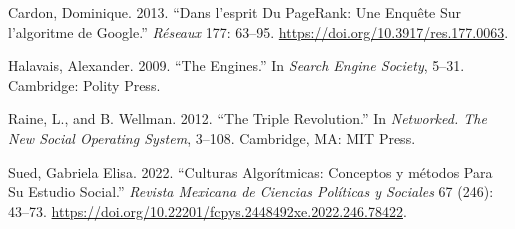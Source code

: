 \documentclass[
]{interact}
\newlength{\cslhangindent}
\newenvironment{CSLReferences}[2] %
 {\begin{list}{}{%
  \setlength{\itemindent}{0pt}
  \setlength{\leftmargin}{0pt}
  \setlength{\parsep}{0pt}
  \ifodd #1
   \setlength{\leftmargin}{\cslhangindent}
   \setlength{\itemindent}{-1\cslhangindent}
  \fi
  \setlength{\itemsep}{#2\baselineskip}}}
 {\end{list}}
\begin{document}
\label{refs}
\begin{CSLReferences}{1}{0}
Cardon, Dominique. 2013. {``Dans l'esprit Du {PageRank}: {Une} Enqu{ê}te
Sur l'algoritme de {Google}.''} \emph{R{é}seaux} 177: 63--95.
\url{https://doi.org/10.3917/res.177.0063}.

Halavais, Alexander. 2009. {``The Engines.''} In \emph{Search Engine
Society}, 5--31. Cambridge: Polity Press.

Raine, L., and B. Wellman. 2012. {``The Triple Revolution.''} In
\emph{Networked. {The} New Social Operating System}, 3--108. Cambridge,
MA: MIT Press.

Sued, Gabriela Elisa. 2022. {``Culturas Algor{í}tmicas: Conceptos y
m{é}todos Para Su Estudio Social.''} \emph{Revista Mexicana de Ciencias
Pol{í}ticas y Sociales} 67 (246): 43--73.
\url{https://doi.org/10.22201/fcpys.2448492xe.2022.246.78422}.

\end{CSLReferences}
\end{document}

